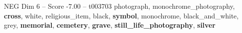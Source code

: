 \begin{textsample}{NEG Dim 6 – Score -7.00 – t003703}  \label{ex:f6_neg_028}
photograph, monochrome\_photography, \textbf{cross}, white, religious\_item, black, \textbf{symbol}, monochrome, black\_and\_white, grey, \textbf{memorial}, \textbf{cemetery}, \textbf{grave}, \textbf{still\_life\_photography}, \textbf{silver}

\end{textsample}

